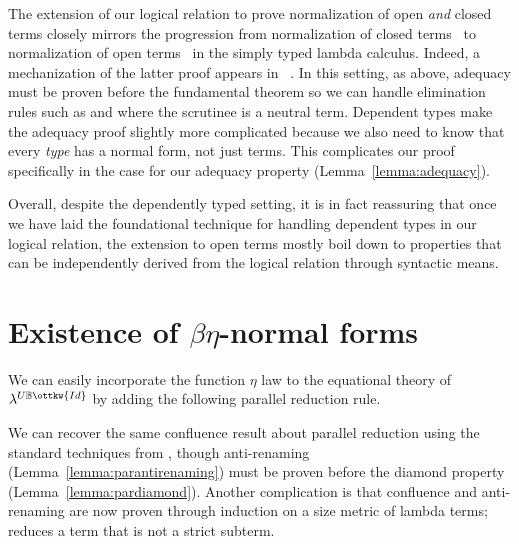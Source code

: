 \documentclass[acmsmall,screen=true,
\ifpublic review=false\else,review=true\fi
  ,anonymous=\ifanonymous true\else false\fi]{acmart}
\newcommand{\lang}{$\lambda^{U\mathbb{B}\ottkw{Id}}$\xspace}
\newcommand{\scw}[1]{}
\begin{document}
The extension of our logical relation to prove normalization of open
\emph{and} closed terms closely mirrors the progression from
normalization of closed terms~\citep{harpertait} to normalization of
open terms~\citep{harperkripke} in the simply typed lambda calculus.
Indeed, a mechanization of the latter proof appears in ~\citet{abel2019poplmark}.
In this setting, as above, adequacy must be proven before the
fundamental theorem so we can handle elimination rules such as
 and  where the scrutinee is a neutral term. %
%
Dependent types make the adequacy proof slightly more complicated because we
also need to know that every \emph{type} has a normal form, not just
terms. This complicates our proof specifically in the  case for
our adequacy property (Lemma~\ref{lemma:adequacy}).

Overall, despite the dependently typed setting, it is in fact reassuring that
once we have laid the foundational technique for handling dependent types in
our logical relation, the extension to open terms mostly boil down to
properties that can be independently derived from the logical relation through
syntactic means.

\section{Existence of $\beta\eta$-normal forms}
\label{sec:betaeta}
\scw{Need an introduction to this section. Why do we care about this new
rule? What does this section demonstrate?}
\scw{The way we describe this
section should more clearly indicate that we have a mechanized version of this
proof. And include pointers on where readers might refer to it.}
We can easily incorporate the function $\eta$ law to the equational
theory of \lang{} by adding the following parallel reduction rule.
\begin{center}
\end{center}
We can recover the same confluence result about parallel reduction using the
standard techniques from \citet{barendregt:lambda-calculi-with-types,
  takahashi-parallel-reduction}, though anti-renaming
(Lemma~\ref{lemma:parantirenaming}) must be proven before the diamond property
(Lemma~\ref{lemma:pardiamond}). Another complication is that
confluence\scw{diamond property?} and anti-renaming are now proven through
induction on a size metric of lambda terms;  reduces a term
that is not a strict subterm.
\end{document}
